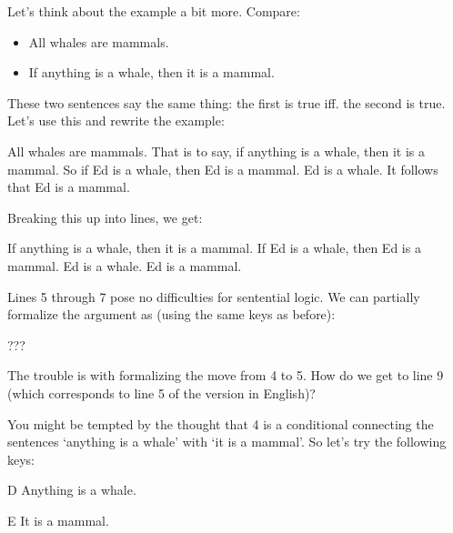 Let's think about the example a bit more. Compare:

\begin{itemize}

 \item All whales are mammals.

 \item If anything is a whale, then it is a mammal.

\end{itemize}

These two sentences say the same thing: the first is true iff. the second is  
true. Let's use this and rewrite the example:

\begin{Example}\label{ex:edTheWhale}
 All whales are mammals. That is to say, if anything is a whale, then it is a 
 mammal. So if Ed is a whale, then Ed is a mammal. Ed is a whale. It follows 
 that Ed is a mammal.
\end{Example}

Breaking this up into lines, we get:

\begin{argument}

 \aitem If anything is a whale, then it is a mammal.
 \aergo If Ed is a whale, then Ed is a mammal.
 \aitem Ed is a whale.
 \aergo Ed is a mammal.

\end{argument}

Lines 5 through 7 pose no difficulties for sentential logic. We can partially 
formalize the argument as (using the same keys as before):

\begin{argumentN}[8]
\aitem ???
 \aitem {}
 \aitem {}
 \aitem {}

\end{argumentN}

The trouble is with formalizing the move from 4 to 5. How do we get to line 9 
(which corresponds to line 5 of the version in English)?

You might be tempted by the thought that 4 is a conditional connecting the 
sentences `anything is a whale' with `it is a mammal'. So let's try the 
following keys:

\begin{lkey*}

\item[D] Anything is a whale.
\item[E] It is a mammal.

\end{lkey*}

